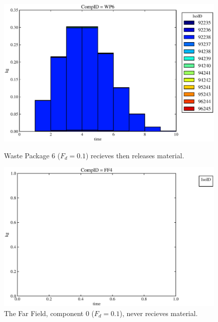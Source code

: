 \begin{figure}[ht]
\begin{minipage}[b]{0.45\linewidth}
\end{minipage}
\hspace{0.05\linewidth}
\begin{minipage}[b]{0.45\linewidth}
  \includegraphics[width=\textwidth]{./chapters/demonstration/base/drIII2.eps}
  \caption[Case DRIII Waste Package Contaminants.]{ 
    Waste Package 6 ($F_d = 0.1$) recieves then releases material. 
    }
  \label{fig:drIIIwp6}

  \includegraphics[width=\textwidth]{./chapters/demonstration/base/drIII0.eps}
  \caption[Case DRIII Waste Package Contaminants.]{ 
    The Far Field, component 0 ($F_d = 0.1$), never recieves material.
    }
  \label{fig:drIIIff0}


  \end{minipage}
\end{figure}
\FloatBarrier



